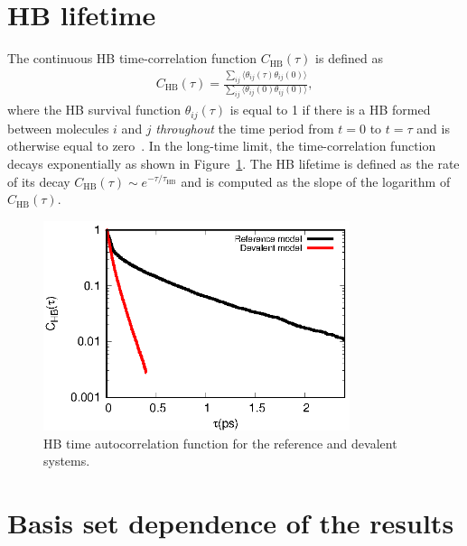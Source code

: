 \documentclass[journal=jacsat,manuscript=article]{achemso}
\newcommand{\bea}{\begin{eqnarray}}
\newcommand{\eea}{\end{eqnarray}}
\begin{document}
\section{HB lifetime} 

The continuous HB time-correlation function $C_{\text{HB}}(\tau)$ is defined as 
%
\bea
C_{\text{HB}}(\tau) = \frac{\sum_{ij}\langle \theta_{ij}(\tau)\theta_{ij}(0) \rangle}{\sum_{ij}\langle \theta_{ij}(0) \theta_{ij}(0) \rangle} \label{Eq:HBdecay},
\eea
%
where the HB survival function $\theta_{ij}(\tau)$ is equal to 1 if there is a HB formed between molecules $i$ and $j$ \emph{throughout} the time period from $t=0$ to $t=\tau$ and is otherwise equal to zero~\cite{rapaport1983hydrogen,starr1999fast}. 
In the long-time limit, the time-correlation function decays exponentially as shown in Figure~\ref{Fig:HBdecay}. 
The HB lifetime is defined as the rate of its decay $C_{\text{HB}}(\tau) \sim e^{-\tau/\tau_{\text{HB}}}$ and is computed as the slope of the logarithm of $C_{\text{HB}}(\tau)$.


\begin{figure}
\includegraphics[width=0.8\textwidth]{new_hbdecay}
\caption{HB time autocorrelation function for the reference and devalent systems.} \label{Fig:HBdecay}
\end{figure}

\section{Basis set dependence of the results} 
\end{document}
